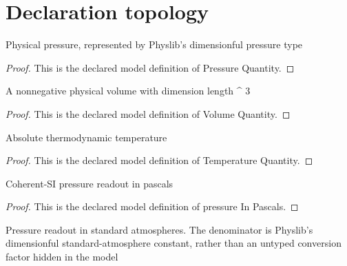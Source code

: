 \section{Declaration topology}
\begin{definition}
  \label{def:physics:phyx-mini-0343:phyxminiproblems-problemphyxmini0343-pressurequantity}
  Physical pressure, represented by Physlib's dimensionful pressure type
\end{definition}
\begin{proof}
  This is the declared model definition of Pressure Quantity.
\end{proof}
\begin{definition}
  \label{def:physics:phyx-mini-0343:phyxminiproblems-problemphyxmini0343-volumequantity}
  A nonnegative physical volume with dimension length \textasciicircum{} 3
\end{definition}
\begin{proof}
  This is the declared model definition of Volume Quantity.
\end{proof}
\begin{definition}
  \label{def:physics:phyx-mini-0343:phyxminiproblems-problemphyxmini0343-temperaturequantity}
  Absolute thermodynamic temperature
\end{definition}
\begin{proof}
  This is the declared model definition of Temperature Quantity.
\end{proof}
\begin{definition}
  \label{def:physics:phyx-mini-0343:phyxminiproblems-problemphyxmini0343-pressureinpascals}
  Coherent-SI pressure readout in pascals
\end{definition}
\begin{proof}
  This is the declared model definition of pressure In Pascals.
\end{proof}
\begin{definition}
  \label{def:physics:phyx-mini-0343:phyxminiproblems-problemphyxmini0343-pressureinatmospheres}
  Pressure readout in standard atmospheres. The denominator is Physlib's dimensionful standard-atmosphere constant, rather than an untyped conversion factor hidden in the model
\end{definition}
